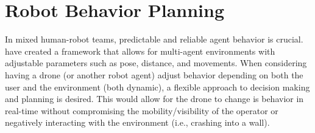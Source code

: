 \smallskip


\section{Robot Behavior Planning}

In mixed human-robot teams, predictable and reliable agent behavior is crucial.  \cite{hrabia1} have created a framework that allows for multi-agent environments with adjustable parameters such as pose, distance, and movements. When considering having a drone (or another robot agent) adjust behavior depending on both the user and the environment (both dynamic), a flexible approach to decision making and planning is desired. This would allow for the drone to change is behavior in real-time without compromising the mobility/visibility of the operator or negatively interacting with the environment (i.e., crashing into a wall). 
\smallskip


